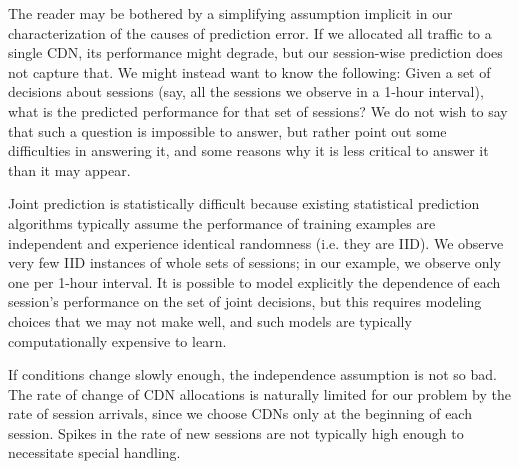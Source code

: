 The reader may be bothered by a simplifying assumption implicit in our characterization of the causes of prediction error.  If we allocated all traffic to a single CDN, its performance might degrade, but our session-wise prediction does not capture that.  We might instead want to know the following: Given a set of decisions about sessions (say, all the sessions we observe in a 1-hour interval), what is the predicted performance for that set of sessions?  We do not wish to say that such a question is impossible to answer, but rather point out some difficulties in answering it, and some reasons why it is less critical to answer it than it may appear.

Joint prediction is statistically difficult because existing statistical prediction algorithms typically assume the performance of training examples are independent and experience identical randomness (i.e. they are IID).  We observe very few IID instances of whole sets of sessions; in our example, we observe only one per 1-hour interval.  It is possible to model explicitly the dependence of each session’s performance on the set of joint decisions, but this requires modeling choices that we may not make well, and such models are typically computationally expensive to learn. \fillme

If conditions change slowly enough, the independence assumption is not so bad.
The rate of change of CDN allocations is naturally limited for our problem by the rate of session arrivals, since we choose CDNs only at the beginning of each session.  Spikes in the rate of new sessions are not typically high enough to necessitate special handling.  

